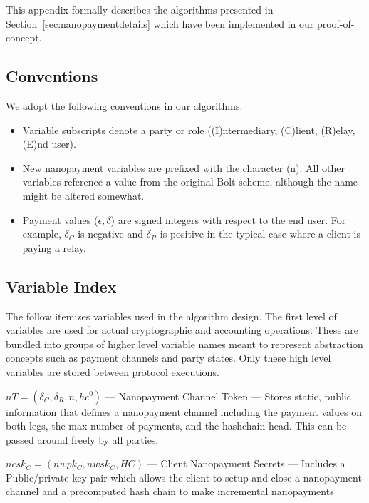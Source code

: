 This appendix formally describes the algorithms presented in Section~\ref{sec:nanopaymentdetails} which have been implemented in our proof-of-concept. 

\subsection{Conventions}

We adopt the following conventions in our algorithms.

\begin{itemize}
\item Variable subscripts denote a party or role ((I)ntermediary,
  (C)lient, (R)elay, (E)nd user).
\item New nanopayment variables are prefixed with the character
  (n). All other variables reference a value from the original Bolt
  scheme, although the name might be altered somewhat.
\item Payment values ($\epsilon, \delta$) are signed integers with
  respect to the end user. For example, $\delta_C$ is negative and
  $\delta_R$ is positive in the typical case where a client is paying
  a relay.
\end{itemize}

\subsection{Variable Index}

The follow itemizes variables used in the algorithm design. The first level of
variables are used for actual cryptographic and accounting operations. These are
bundled into groups of higher level variable names meant to represent
abstraction concepts such as payment channels and party states. Only these high
level variables are stored between protocol executions.

$nT = (\delta_C, \delta_R, n, hc^0)$ --- Nanopayment Channel Token ---
Stores static, public information that defines a nanopayment channel including
the payment values on both legs, the max number of payments, and the hashchain
head. This can be passed around freely by all parties.

$ncsk_C = (nwpk_C, nwsk_C, HC)$ --- Client Nanopayment Secrets --- Includes
a Public/private key pair which allows the client to setup and close a
nanopayment channel and a precomputed hash chain to make incremental
nanopayments

